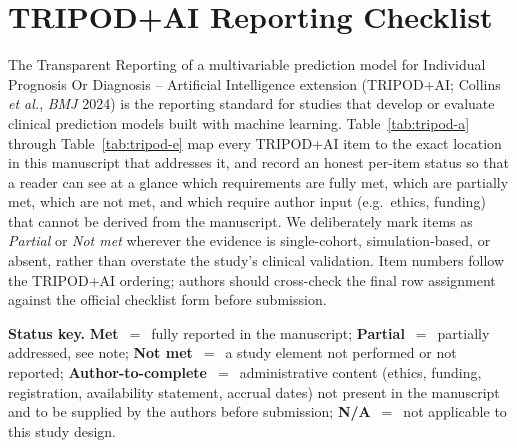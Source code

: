 
\section{TRIPOD+AI Reporting Checklist}
\label{app:tripod}

The Transparent Reporting of a multivariable prediction model for Individual Prognosis Or Diagnosis --
Artificial Intelligence extension (TRIPOD+AI; Collins \emph{et al.}, \emph{BMJ} 2024) is the reporting
standard for studies that develop or evaluate clinical prediction models built with machine learning.
Table~\ref{tab:tripod-a} through Table~\ref{tab:tripod-e} map every TRIPOD+AI item to the exact location in
this manuscript that addresses it, and record an honest per-item status so that a reader can see at a glance
which requirements are fully met, which are partially met, which are not met, and which require author input
(e.g.\ ethics, funding) that cannot be derived from the manuscript. We deliberately mark items as
\emph{Partial} or \emph{Not met} wherever the evidence is single-cohort, simulation-based, or absent, rather
than overstate the study's clinical validation. Item numbers follow the TRIPOD+AI ordering; authors should
cross-check the final row assignment against the official checklist form before submission.

\noindent\textbf{Status key.} \textbf{Met}~$=$~fully reported in the manuscript;
\textbf{Partial}~$=$~partially addressed, see note; \textbf{Not met}~$=$~a study element not performed or
not reported; \textbf{Author-to-complete}~$=$~administrative content (ethics, funding, registration,
availability statement, accrual dates) not present in the manuscript and to be supplied by the authors before
submission; \textbf{N/A}~$=$~not applicable to this study design.

